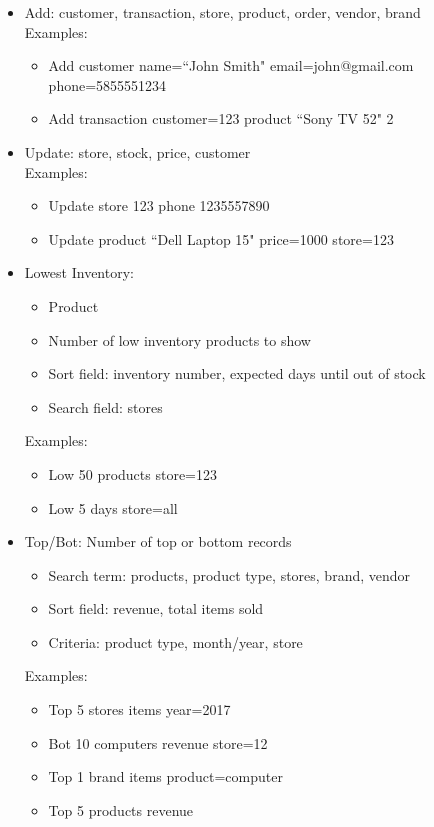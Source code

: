 \documentclass{article}
\begin{document}
    \begin{itemize}
      \item
        Add: customer, transaction, store, product, order, vendor, brand\\
        Examples:
        \begin{itemize}
          \item Add customer name=``John Smith" email=john@gmail.com phone=5855551234
          \item Add transaction customer=123 product ``Sony TV 52" 2
        \end{itemize}

      \item
        Update: store, stock, price, customer\\
        Examples:
        \begin{itemize}
          \item Update store 123 phone 1235557890
          \item Update product ``Dell Laptop 15" price=1000 store=123
        \end{itemize}

        \pagebreak

      \item 
        Lowest Inventory:
        \begin{itemize}
          \item Product
          \item Number of low inventory products to show
          \item Sort field: inventory number, expected days until out of stock
          \item Search field: stores
        \end{itemize}
        Examples:
        \begin{itemize}
          \item Low 50 products store=123
          \item Low 5 days store=all
        \end{itemize}

      \item
        Top/Bot: Number of top or bottom records
        \begin{itemize}
          \item Search term: products, product type, stores, brand, vendor
          \item Sort field: revenue, total items sold
          \item Criteria: product type, month/year, store
        \end{itemize}
        Examples:
        \begin{itemize}
          \item Top 5 stores items year=2017
          \item Bot 10 computers revenue store=12
          \item Top 1 brand items product=computer
          \item Top 5 products revenue
        \end{itemize}


\end{itemize}
\end{document}
